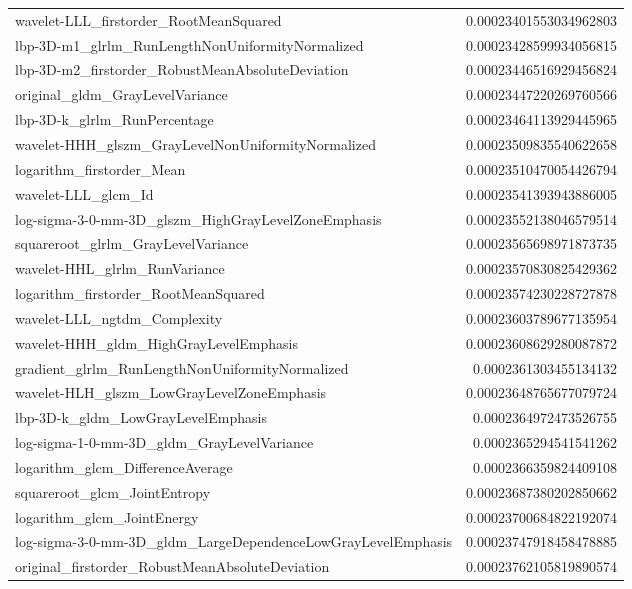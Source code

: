 {\begin{xltabular}[H]{\textwidth}{X r}
        wavelet-LLL\_firstorder\_RootMeanSquared & 0.00023401553034962803 \\
        lbp-3D-m1\_glrlm\_RunLengthNonUniformityNormalized & 0.00023428599934056815 \\
        lbp-3D-m2\_firstorder\_RobustMeanAbsoluteDeviation & 0.00023446516929456824 \\
        original\_gldm\_GrayLevelVariance & 0.00023447220269760566 \\
        lbp-3D-k\_glrlm\_RunPercentage & 0.00023464113929445965 \\
        wavelet-HHH\_glszm\_GrayLevelNonUniformityNormalized & 0.00023509835540622658 \\
        logarithm\_firstorder\_Mean & 0.00023510470054426794 \\
        wavelet-LLL\_glcm\_Id & 0.00023541393943886005 \\
        log-sigma-3-0-mm-3D\_glszm\_HighGrayLevelZoneEmphasis & 0.00023552138046579514 \\
        squareroot\_glrlm\_GrayLevelVariance & 0.00023565698971873735 \\
        wavelet-HHL\_glrlm\_RunVariance & 0.00023570830825429362 \\
        logarithm\_firstorder\_RootMeanSquared & 0.00023574230228727878 \\
        wavelet-LLL\_ngtdm\_Complexity & 0.00023603789677135954 \\
        wavelet-HHH\_gldm\_HighGrayLevelEmphasis & 0.00023608629280087872 \\
        gradient\_glrlm\_RunLengthNonUniformityNormalized & 0.0002361303455134132 \\
        wavelet-HLH\_glszm\_LowGrayLevelZoneEmphasis & 0.00023648765677079724 \\
        lbp-3D-k\_gldm\_LowGrayLevelEmphasis & 0.0002364972473526755 \\
        log-sigma-1-0-mm-3D\_gldm\_GrayLevelVariance & 0.0002365294541541262 \\
        logarithm\_glcm\_DifferenceAverage & 0.0002366359824409108 \\
        squareroot\_glcm\_JointEntropy & 0.00023687380202850662 \\
        logarithm\_glcm\_JointEnergy & 0.00023700684822192074 \\
        log-sigma-3-0-mm-3D\_gldm\_LargeDependenceLowGrayLevelEmphasis & 0.00023747918458478885 \\
        original\_firstorder\_RobustMeanAbsoluteDeviation & 0.00023762105819890574 \\

\end{xltabular}}

